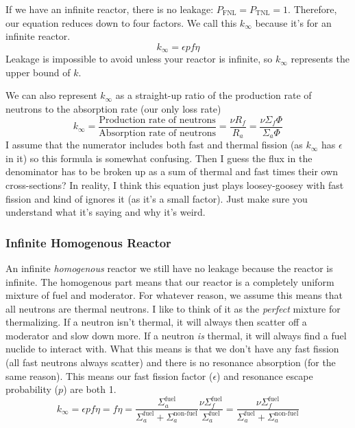 \documentclass[letter]{article}
\begin{document}
If we have an infinite reactor, there is no leakage:
$P_{\text{FNL}}=P_{\text{TNL}}=1$. Therefore, our equation reduces
down to four factors. We call this $k_\infty$ because it's for an
infinite reactor.\cite[Lec. 10]{lecture}
\begin{equation*}
  k_\infty=\epsilon{}pf\eta
\end{equation*}
Leakage is impossible to avoid unless your reactor is infinite, so
$k_\infty$ represents the upper bound of $k$.\cite[Lec. 10]{lecture}

\vspace{10pt}
We can also represent $k_\infty$ as a straight-up ratio of the
production rate of neutrons to the absorption rate (our only loss
rate)\cite[Lec. 13]{lecture}
\begin{equation*}
  k_\infty=\frac{\text{Production rate of neutrons}}{\text{Absorption
      rate of neutrons}}=\frac{\nu{}R_f}{R_a}=\frac{\nu\Sigma_f\Phi}{\Sigma_a\Phi}
\end{equation*}
I assume that the numerator includes both fast and thermal fission (as
$k_\infty$ has $\epsilon$ in it) so this formula is somewhat
confusing. Then I guess the flux in the denominator has to be broken
up as a sum of thermal and fast times their own cross-sections? In
reality, I think this equation just plays loosey-goosey with fast
fission and kind of ignores it (as it's a small factor). Just make
sure you understand what it's saying and why it's weird.

\subsubsection{Infinite Homogenous Reactor}
An infinite \textit{homogenous} reactor we still have no leakage
because the reactor is infinite. The homogenous part means that our
reactor is a completely uniform mixture of fuel and
moderator.\cite[Lec. 10]{lecture}  For
whatever reason, we assume this means that all neutrons are thermal
neutrons. I like to think of it as the \textit{perfect} mixture for
thermalizing. If a neutron isn't thermal, it will always then scatter
off a moderator and slow down more. If a neutron \textit{is} thermal,
it will always find a fuel nuclide to interact with. What this means
is that we don't have any fast fission (all fast neutrons always
scatter) and there is no resonance absorption (for the same
reason). This means our fast fission factor ($\epsilon$) and resonance
escape probability ($p$) are both 1.\cite[Lec. 10, 13]{lecture}
\begin{equation*}
  k_\infty=\epsilon{}pf\eta=f\eta=\frac{\Sigma^{\text{fuel}}_a}{\Sigma^{\text{fuel}}_a+\Sigma^{\text{non-fuel}}_a}\frac{\nu\Sigma_f^{\text{fuel}}}{\Sigma_a^{\text{fuel}}}=\frac{\nu\Sigma^{\text{fuel}}_f}{\Sigma^{\text{fuel}}_a+\Sigma^{\text{non-fuel}}_a}
\end{equation*}
\end{document}
